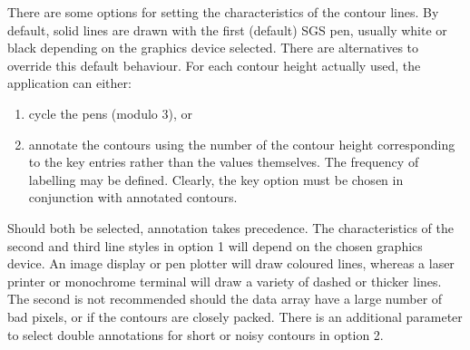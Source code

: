 {{{{         \sstitem
         There are some options for setting the characteristics of the
         contour lines.  By default, solid lines are drawn with the first
         (default) SGS pen, usually white or black depending on the
         graphics device selected.  There are alternatives to override
         this default behaviour. For each contour height actually used,
         the application can either:
        \begin{enumerate}
         \item cycle the pens (modulo 3), or
         \item annotate the contours using the number of the contour 
               height corresponding to the key entries rather than the
               values themselves.  The frequency of labelling may be defined.
               Clearly, the key option must be chosen in conjunction with
               annotated contours.
         \end{enumerate}
         Should both be selected, annotation takes precedence.  The
         characteristics of the second and third line styles in option 1
         will depend on the chosen graphics device. An image display or
         pen plotter will draw coloured lines, whereas a laser printer or
         monochrome terminal will draw a variety of dashed or thicker
         lines.  The second is not recommended should the data array have
         a large number of bad pixels, or if the contours are closely
         packed. There is an additional parameter to select double
         annotations for short or noisy contours in option 2.
      }
   }
   }}
